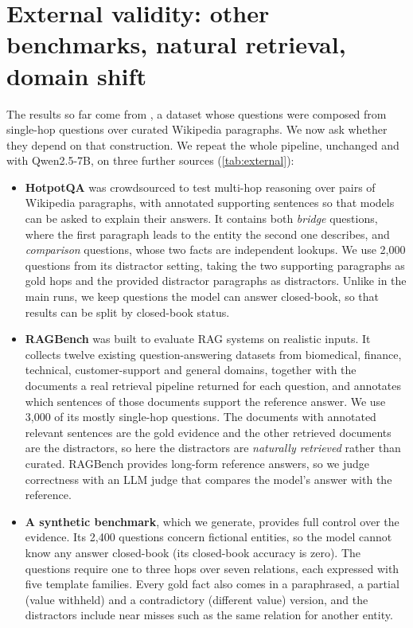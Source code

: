 \section{External validity: other benchmarks, natural retrieval, domain shift}
\label{sec:external}

The results so far come from \musique{}, a dataset whose questions were composed from single-hop questions over curated Wikipedia paragraphs. We now ask whether they depend on that construction. We repeat the whole pipeline, unchanged and with Qwen2.5-7B, on three further sources (\cref{tab:external}):
\begin{itemize}
  \item \textbf{HotpotQA} \cite{yang2018hotpotqa} was crowdsourced to test multi-hop reasoning over pairs of Wikipedia paragraphs, with annotated supporting sentences so that models can be asked to explain their answers. It contains both \emph{bridge} questions, where the first paragraph leads to the entity the second one describes, and \emph{comparison} questions, whose two facts are independent lookups. We use 2{,}000 questions from its distractor setting, taking the two supporting paragraphs as gold hops and the provided distractor paragraphs as distractors. Unlike in the main runs, we keep questions the model can answer closed-book, so that results can be split by closed-book status.
  \item \textbf{RAGBench} \cite{friel2024ragbench} was built to evaluate RAG systems on realistic inputs. It collects twelve existing question-answering datasets from biomedical, finance, technical, customer-support and general domains, together with the documents a real retrieval pipeline returned for each question, and annotates which sentences of those documents support the reference answer. We use 3{,}000 of its mostly single-hop questions. The documents with annotated relevant sentences are the gold evidence and the other retrieved documents are the distractors, so here the distractors are \emph{naturally retrieved} rather than curated. RAGBench provides long-form reference answers, so we judge correctness with an LLM judge that compares the model's answer with the reference.
  \item \textbf{A synthetic benchmark}, which we generate, provides full control over the evidence. Its 2{,}400 questions concern fictional entities, so the model cannot know any answer closed-book (its closed-book accuracy is zero). The questions require one to three hops over seven relations, each expressed with five template families. Every gold fact also comes in a paraphrased, a partial (value withheld) and a contradictory (different value) version, and the distractors include near misses such as the same relation for another entity.
\end{itemize}

